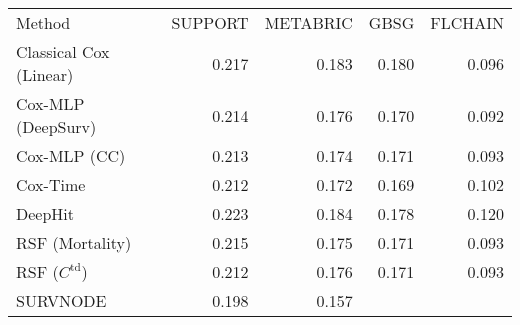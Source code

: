 \begin{tabular}{lrrrr}
    Method &         SUPPORT &        METABRIC &   GBSG &         FLCHAIN \\
    Classical Cox (Linear)       &           0.217 &           0.183 &           0.180 &           0.096 \\
    Cox-MLP (DeepSurv) &           0.214 &           0.176 &           0.170 &  0.092 \\
    Cox-MLP (CC)       &           0.213 &           0.174 &           0.171 &           0.093 \\
    Cox-Time           &           0.212 &  0.172 &  0.169 &           0.102 \\
    DeepHit            &           0.223 &           0.184 &           0.178 &           0.120 \\
    RSF (Mortality)    &           0.215 &           0.175 &           0.171 &           0.093 \\
    RSF ($C^\text{td}$)          &  0.212 &           0.176 &           0.171 &           0.093 \\
    SURVNODE &  0.198 &0.157 & & \\
\end{tabular}